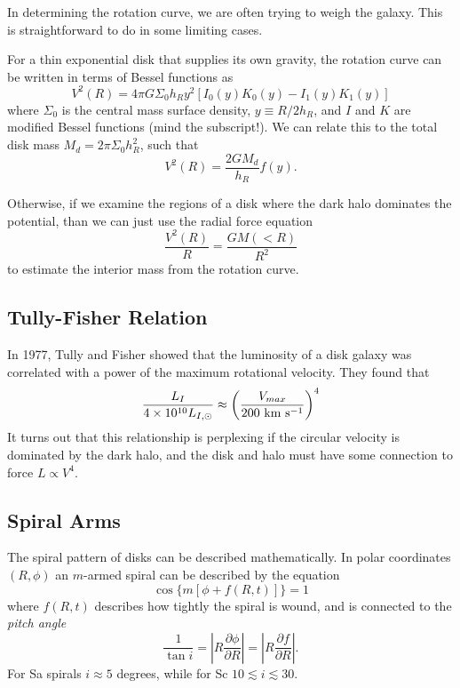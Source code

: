 \documentclass[]{article}
\begin{document}
In determining the rotation curve, we are often trying to weigh the galaxy.  This is straightforward to do in
some limiting cases.

For a thin exponential disk that supplies its own gravity, the rotation curve can be written in terms of Bessel
functions as
\begin{equation}
V^2(R) = 4\pi G \Sigma_0 h_R y^2 [I_0(y) K_0(y) - I_1(y) K_1(y)]
\end{equation}
\noindent
where $\Sigma_0$ is the central mass surface density, $y\equiv R/2h_R$,
 and $I$ and $K$ are modified Bessel functions (mind the subscript!). We can
relate this to the total disk mass $M_d = 2\pi\Sigma_0 h_R^2$, such that
\begin{equation}
V^2(R) = \frac{2GM_d}{h_R}f(y).
\end{equation}

Otherwise, if we examine the regions of a disk where the dark halo dominates the potential, than we can just use
the radial force equation
\begin{equation}
\frac{V^2(R)}{R} = \frac{GM(<R)}{R^2}
\end{equation}
\noindent 
to estimate the interior mass from the rotation curve.

\subsection{Tully-Fisher Relation}

In 1977, Tully and Fisher showed that the luminosity of a disk galaxy was correlated with a
power of the maximum rotational velocity.  They found that
\begin{equation}
\frac{L_I}{4\times10^{10} L_{I,\odot}} \approx \left(\frac{V_{max}}{200~\mathrm{km}~\mathrm{s}^{-1}}\right)^4
\end{equation}
\noindent
It turns out that this relationship is perplexing if the circular velocity is dominated
by the dark halo, and the disk and halo must have some connection to force $L\propto V^4$.


\subsection{Spiral Arms}

The spiral pattern of disks can be described mathematically.  In polar
coordinates $(R,\phi)$ an $m$-armed spiral
can be described by the equation
\begin{equation}
\cos\{m[\phi + f(R,t)]\}=1
\end{equation}
\noindent
where $f(R,t)$ describes how tightly the spiral is wound, and is connected
to the {\it pitch angle}
\begin{equation}
\frac{1}{\tan i} = \left|R\frac{\partial\phi}{\partial R}\right| = \left|R\frac{\partial f}{\partial R}\right|.
\end{equation}
\noindent
For Sa spirals $i\approx5$ degrees, while for Sc $10\lesssim i \lesssim 30$.
\end{document}
